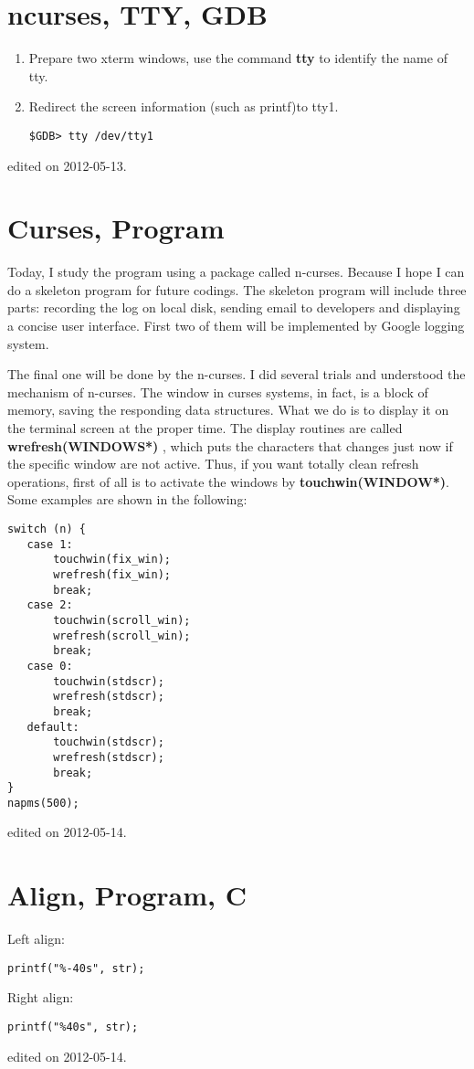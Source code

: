 \section{ncurses, TTY, GDB}
\begin{enumerate}
\item Prepare two xterm windows, use the command {\bf tty} to identify the name of tty.
\item Redirect the screen information (such as printf)to tty1.
\begin{verbatim}
$GDB> tty /dev/tty1
\end{verbatim}
\end{enumerate}
\hfill {\tiny  edited on 2012-05-13.}
%
\section{Curses, Program}
Today, I study the program using a package called n-curses. 
Because I hope I can do a skeleton program for future codings. 
The skeleton program will include three parts: recording the log on local disk, sending email to developers and displaying a concise user interface. 
First two of them will be implemented by Google logging system. 
\par The final one will be done by the n-curses.
I did several trials and understood the mechanism of n-curses. 
The window in curses systems, in fact, is a block of memory, saving the responding data structures.
What we do is to display it on the terminal screen at the proper time.
The display routines are called {\bf wrefresh(WINDOWS*) }, which puts the characters that changes just now if the specific window are not active.
Thus, if you want totally clean refresh operations, first of all is to activate the windows by {\bf touchwin(WINDOW*)}.
Some examples are shown in the following:
\begin{verbatim}
switch (n) {
   case 1:
       touchwin(fix_win);
       wrefresh(fix_win);
       break;
   case 2:
       touchwin(scroll_win);
       wrefresh(scroll_win);
       break;
   case 0:
       touchwin(stdscr);
       wrefresh(stdscr);
       break;
   default:
       touchwin(stdscr);
       wrefresh(stdscr);
       break;
}
napms(500);
\end{verbatim}
\hfill {\tiny  edited on 2012-05-14.}
%
\section{Align, Program, C}
Left align:
\begin{verbatim}
printf("%-40s", str);
\end{verbatim}
Right align:
\begin{verbatim}
printf("%40s", str);
\end{verbatim}
\hfill {\tiny  edited on 2012-05-14.}
%
